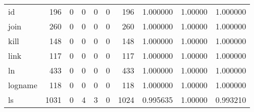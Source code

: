 \begin{longtable}{lrrrrrrrrr}
id        &                    196 &                                  0 &                                 0 &                                0 &                                 0 &                             196 &                                1.000000 &                                1.00000 &                             1.000000 \\
join      &                    260 &                                  0 &                                 0 &                                0 &                                 0 &                             260 &                                1.000000 &                                1.00000 &                             1.000000 \\
kill      &                    148 &                                  0 &                                 0 &                                0 &                                 0 &                             148 &                                1.000000 &                                1.00000 &                             1.000000 \\
link      &                    117 &                                  0 &                                 0 &                                0 &                                 0 &                             117 &                                1.000000 &                                1.00000 &                             1.000000 \\
ln        &                    433 &                                  0 &                                 0 &                                0 &                                 0 &                             433 &                                1.000000 &                                1.00000 &                             1.000000 \\
logname   &                    118 &                                  0 &                                 0 &                                0 &                                 0 &                             118 &                                1.000000 &                                1.00000 &                             1.000000 \\
ls        &                   1031 &                                  0 &                                 4 &                                3 &                                 0 &                            1024 &                                0.995635 &                                1.00000 &                             0.993210 \\

\end{longtable}
